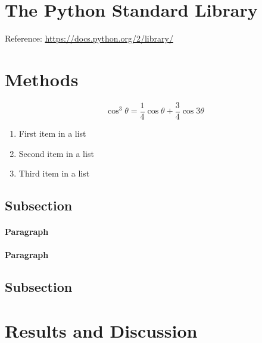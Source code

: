 \documentclass[fleqn,10pt]{SelfArx} %
\begin{document}
	\section{The Python Standard Library} 
	
	Reference: \url{https://docs.python.org/2/library/}
	
	
	
	
	\section{Methods}

	\begin{equation}
	\cos^3 \theta =\frac{1}{4}\cos\theta+\frac{3}{4}\cos 3\theta
	\label{eq:refname2}
	\end{equation}
	
	\lipsum[5] %
	
	\begin{enumerate}[noitemsep] %
		\item First item in a list
		\item Second item in a list
		\item Third item in a list
	\end{enumerate}
	
	\subsection{Subsection}
	
	\lipsum[6] %
	
	\paragraph{Paragraph} \lipsum[7] %
	\paragraph{Paragraph} \lipsum[8] %
	
	\subsection{Subsection}
	
	\lipsum[9] %
		
	
	\section{Results and Discussion}
	
\end{document}
